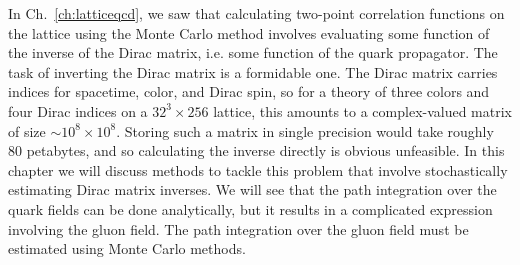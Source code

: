In Ch.~\ref{ch:latticeqcd}, we saw that calculating two-point correlation functions on the lattice using the Monte Carlo method involves evaluating some function of the inverse of the Dirac matrix, i.e. some function of the quark propagator. The task of inverting the Dirac matrix is a formidable one. The Dirac matrix carries indices for spacetime, color, and Dirac spin, so for a theory of three colors and four Dirac indices on a $32^3\times 256$ lattice, this amounts to a complex-valued matrix of size $\sim 10^8\times 10^8$. Storing such a matrix in single precision would take roughly 80 petabytes, and so calculating the inverse directly is obvious unfeasible. In this chapter we will discuss methods to tackle this problem that involve stochastically estimating Dirac matrix inverses. We will see that the path integration over the quark fields can be done analytically, but it results in a complicated expression involving the gluon field. The path integration over the gluon field must be estimated using Monte Carlo methods.
